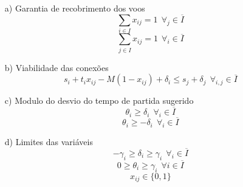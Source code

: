 \begin{enumerate}


\item[a)] Garantia de recobrimento dos voos \\
\begin{equation}
  \sum_{i \in I} x_{ij}= 1 \   \ \forall_{j} \in \overline{I} 
\end{equation}
\begin{equation}
\sum_{j \in I} x_{ij} = 1 \   \ \forall_{i} \in \overline{I}
\end{equation}





\item[b)] Viabilidade das conexões \\
\begin{equation}
s_{i} + t_{i}x_{ij} - M(1 - x_{ij}) + \delta_{i} \leq s_{j} + \delta_{j} \   \ \forall_{i,j} \in \overline{I}
\end{equation}

\item[c)] Modulo do desvio do tempo de partida sugerido \\
\begin{equation}
\theta_{i} \geq \delta_{i} \   \ \forall_{i} \in \overline{I}
\end{equation}
\begin{equation}
\theta_{i} \geq -\delta_{i} \   \ \forall_{i} \in \overline{I}
\end{equation}

\item[d)] Limites das variáveis \\
\begin{equation}
-\gamma_{i} \geq \delta_{i} \geq \gamma_{i} \   \ \forall_{i} \in \overline{I}
\end{equation}
\begin{equation}
0 \geq \theta_{i} \geq \gamma_{i} \   \ \forall{i} \in \overline{I}
\end{equation}
\begin{equation}
x_{ij} \in \{0,1\}
\end{equation}
\end{enumerate}

